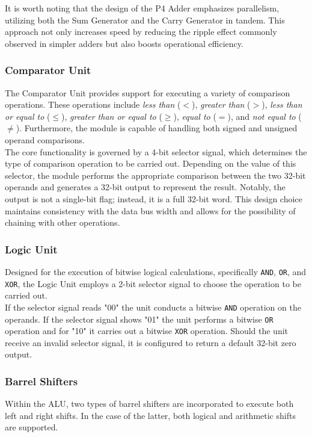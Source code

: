 It is worth noting that the design of the P4 Adder emphasizes parallelism, utilizing both the Sum Generator and the Carry Generator in tandem. This approach not only increases speed by reducing the ripple effect commonly observed in simpler adders but also boosts operational efficiency.

\subsubsection{Comparator Unit}
The Comparator Unit provides support for executing a variety of comparison operations. These operations include \textit{less than} ($<$), \textit{greater than} ($>$), \textit{less than or equal to} ($\leq$), \textit{greater than or equal to} ($\geq$), \textit{equal to} ($=$), and \textit{not equal to} ($\neq$). Furthermore, the module is capable of handling both signed and unsigned operand comparisons. \\

The core functionality is governed by a 4-bit selector signal, which determines the type of comparison operation to be carried out. Depending on the value of this selector, the module performs the appropriate comparison between the two 32-bit operands and generates a 32-bit output to represent the result. Notably, the output is not a single-bit flag; instead, it is a full 32-bit word. This design choice maintains consistency with the data bus width and allows for the possibility of chaining with other operations.

\subsubsection{Logic Unit}
Designed for the execution of bitwise logical calculations, specifically \texttt{AND}, \texttt{OR}, and \texttt{XOR}, the Logic Unit employs a 2-bit selector signal to choose the operation to be carried out. \\

If the selector signal reads "00" the unit conducts a bitwise \texttt{AND} operation on the operands. If the selector signal shows "01" the unit performs a bitwise \texttt{OR} operation and for "10" it carries out a bitwise \texttt{XOR} operation. Should the unit receive an invalid selector signal, it is configured to return a default 32-bit zero output.

\subsubsection{Barrel Shifters}
Within the ALU, two types of barrel shifters are incorporated to execute both left and right shifts. In the case of the latter, both logical and arithmetic shifts are supported.

